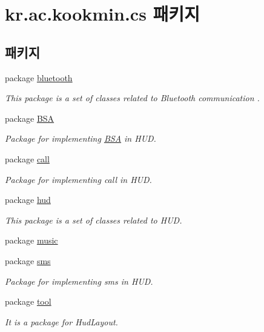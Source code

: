 \hypertarget{namespacekr_1_1ac_1_1kookmin_1_1cs}{}\section{kr.\+ac.\+kookmin.\+cs 패키지}
\label{namespacekr_1_1ac_1_1kookmin_1_1cs}
\subsection*{패키지}
\begin{DoxyCompactItemize}
\item 
package \hyperlink{namespacekr_1_1ac_1_1kookmin_1_1cs_1_1bluetooth}{bluetooth}
\begin{DoxyCompactList}\small\item\em This package is a set of classes related to Bluetooth communication . \end{DoxyCompactList}\item 
package \hyperlink{namespacekr_1_1ac_1_1kookmin_1_1cs_1_1_b_s_a}{B\+S\+A}
\begin{DoxyCompactList}\small\item\em Package for implementing \hyperlink{namespacekr_1_1ac_1_1kookmin_1_1cs_1_1_b_s_a}{B\+S\+A} in H\+U\+D. \end{DoxyCompactList}\item 
package \hyperlink{namespacekr_1_1ac_1_1kookmin_1_1cs_1_1call}{call}
\begin{DoxyCompactList}\small\item\em Package for implementing call in H\+U\+D. \end{DoxyCompactList}\item 
package \hyperlink{namespacekr_1_1ac_1_1kookmin_1_1cs_1_1hud}{hud}
\begin{DoxyCompactList}\small\item\em This package is a set of classes related to H\+U\+D. \end{DoxyCompactList}\item 
package \hyperlink{namespacekr_1_1ac_1_1kookmin_1_1cs_1_1music}{music}
\item 
package \hyperlink{namespacekr_1_1ac_1_1kookmin_1_1cs_1_1sms}{sms}
\begin{DoxyCompactList}\small\item\em Package for implementing sms in H\+U\+D. \end{DoxyCompactList}\item 
package \hyperlink{namespacekr_1_1ac_1_1kookmin_1_1cs_1_1tool}{tool}
\begin{DoxyCompactList}\small\item\em It is a package for Hud\+Layout. \end{DoxyCompactList}\end{DoxyCompactItemize}
